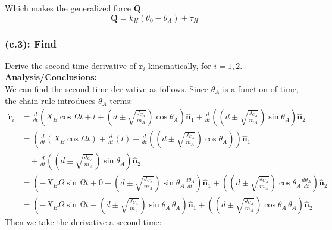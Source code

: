 \documentclass[titlepage]{article}
\begin{document}
\begin{mdframed}[linewidth=1pt, innertopmargin=10pt, innerbottommargin=10pt]
	Which makes the generalized force $\boldsymbol{Q}$:
	\begin{equation}
		\boldsymbol{Q}=k_H(\theta_0-\theta_A)+\tau_H
	\end{equation}
\end{mdframed}

\subsubsection*{(c.3): Find}
Derive the second time derivative of $\boldsymbol{r}_i$ kinematically, for $i=1,2$.\\

\textbf{Analysis/Conclusions:}\\
We can find the second time derivative as follows. Since $\theta_A$ is a function of time, the chain rule introduces $\dot{\theta}_A$ terms:
\begin{equation}
	\begin{split}
		\dot{\boldsymbol{r}}_i&=\frac{d}{dt}\left(X_B\cos\Omega t+l+\left(d\pm\sqrt{\frac{J_{C_A}}{m_A}}\right)\cos\theta_A\right)\hat{\boldsymbol{n}}_1+\frac{d}{dt}\left(\left(d\pm\sqrt{\frac{J_{C_A}}{m_A}}\right)\sin\theta_A\right)\hat{\boldsymbol{n}}_2 \\
		&=\left(\frac{d}{dt}\left(X_B\cos\Omega t\right)+\frac{d}{dt}\left(l\right)+\frac{d}{dt}\left(\left(d\pm\sqrt{\frac{J_{C_A}}{m_A}}\right)\cos\theta_A\right)\right)\hat{\boldsymbol{n}}_1 \\
		&\quad+\frac{d}{dt}\left(\left(d\pm\sqrt{\frac{J_{C_A}}{m_A}}\right)\sin\theta_A\right)\hat{\boldsymbol{n}}_2 \\
		&=\left(-X_B\Omega\sin\Omega t+0-\left(d\pm\sqrt{\frac{J_{C_A}}{m_A}}\right)\sin\theta_A\frac{d\theta_A}{dt}\right)\hat{\boldsymbol{n}}_1+\left(\left(d\pm\sqrt{\frac{J_{C_A}}{m_A}}\right)\cos\theta_A\frac{d\theta_A}{dt}\right)\hat{\boldsymbol{n}}_2 \\
		&=\left(-X_B\Omega\sin\Omega t-\left(d\pm\sqrt{\frac{J_{C_A}}{m_A}}\right)\sin\theta_A\,\dot{\theta}_A\right)\hat{\boldsymbol{n}}_1+\left(\left(d\pm\sqrt{\frac{J_{C_A}}{m_A}}\right)\cos\theta_A\,\dot{\theta}_A\right)\hat{\boldsymbol{n}}_2
	\end{split}
\end{equation}
Then we take the derivative a second time:
\end{document}
